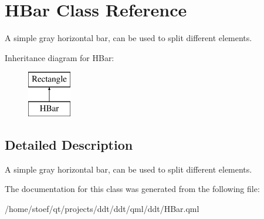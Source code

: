 \hypertarget{classHBar}{\section{H\-Bar Class Reference}
\label{classHBar}
}


A simple gray horizontal bar, can be used to split different elements.  


Inheritance diagram for H\-Bar\-:\begin{figure}[H]
\begin{center}
\leavevmode
\includegraphics[height=2.000000cm]{classHBar}
\end{center}
\end{figure}


\subsection{Detailed Description}
A simple gray horizontal bar, can be used to split different elements. 

The documentation for this class was generated from the following file\-:\begin{DoxyCompactItemize}
\item 
/home/stoef/qt/projects/ddt/ddt/qml/ddt/H\-Bar.\-qml\end{DoxyCompactItemize}
